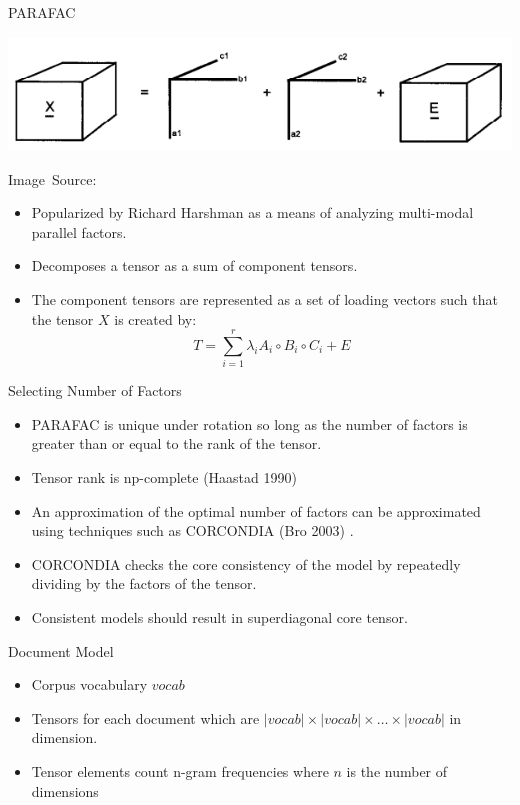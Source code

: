 \documentclass[handout]{beamer}
\newcommand{\imagesource}[1]{{\centering\hfill\break\hbox{\scriptsize Image Source:\thinspace{\small\itshape #1}}\par}}
\begin{document}
\begin{frame}{PARAFAC}
    \begin{center}
    \includegraphics[height=0.20\textheight]{images/parafac}
    \imagesource{Rasmus Bro 1997~\cite{bro1997}}
    \end{center}
    \begin{itemize}[<+->]
        \item Popularized by Richard Harshman \cite{harshman1970} as a means of analyzing multi-modal parallel factors.
        \item Decomposes a tensor as a sum of component tensors.
        \item The component tensors are represented as a set of loading vectors such that the tensor $X$ is created by:
        \[
    T = \displaystyle\sum_{i=1}^{r} \lambda_i A_i \circ B_i \circ C_i + E
        \]
    \end{itemize}
\end{frame}

\begin{frame}{Selecting Number of Factors}
    \begin{itemize}[<+->]
        \item PARAFAC is unique under rotation so long as the number of factors is greater than or equal to the rank of the tensor.
        \item Tensor rank is np-complete (Haastad 1990)\cite{haastad1990}
        \item An approximation of the optimal number of factors can be approximated using techniques such as CORCONDIA (Bro 2003) \cite{bro2003}.
        \item CORCONDIA checks the core consistency of the model by repeatedly dividing by the factors of the tensor.
        \item Consistent models should result in superdiagonal core tensor.
    \end{itemize}
\end{frame}

\begin{frame}{Document Model}
    \begin{itemize}[<+->]
        \item Corpus vocabulary $vocab$
        \item Tensors for each document which are $|vocab| \times |vocab| \times \ldots \times |vocab|$ in dimension.
        \item Tensor elements count n-gram frequencies where $n$ is the number of dimensions
    \end{itemize}
\end{frame}
\end{document}
